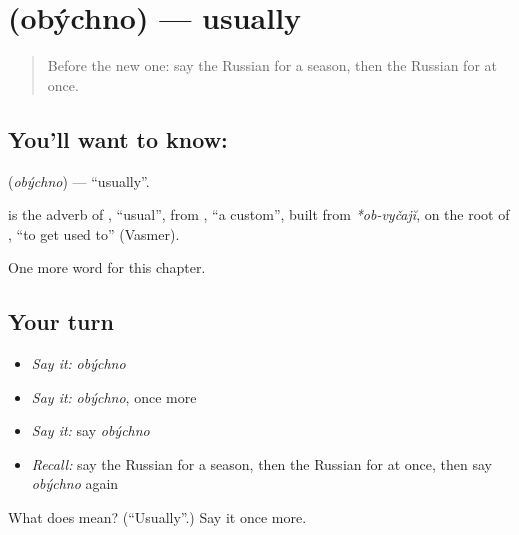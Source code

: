 \section[\texorpdfstring{\ru{обычно} (obýchno)}{обычно (obýchno)}]{ (obýchno) — usually}

\label{lesson:RU-C240-obychno}



\begin{quote}
Before the new one: say the Russian for a season, then the Russian for at once.
\end{quote}

\subsection*{You'll want to know: }
\textbf{} (\emph{obýchno}) — \textquotedblleft{}usually\textquotedblright{}.

\begin{cousinweb}
\textbf{} is the adverb of \emph{}, \textquotedblleft{}usual\textquotedblright{}, from \emph{}, \textquotedblleft{}a custom\textquotedblright{}, built from \emph{*ob-vyčajĭ}, on the root of \emph{}, \textquotedblleft{}to get used to\textquotedblright{} (Vasmer).
\end{cousinweb}

\begin{grammarlens}[title={What you've built}]
One more word for this chapter.
\end{grammarlens}

\subsection*{Your turn}
\begin{itemize}
\raggedright
  \item \emph{Say it:} \emph{obýchno}
  \item \emph{Say it:} \emph{obýchno}, once more
  \item \emph{Say it:} say \emph{obýchno}
  \item \emph{Recall:} say the Russian for a season, then the Russian for at once, then say \emph{obýchno} again
\end{itemize}

\begin{tcolorbox}[breakable,colback=teal!4,colframe=teal!35!black,title={Before you move on}]
What does  mean? (\textquotedblleft{}Usually\textquotedblright{}.) Say it once more.
\end{tcolorbox}
